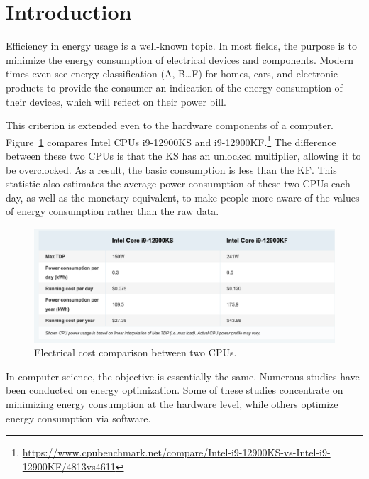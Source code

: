 

\section{Introduction}
Efficiency in energy usage is a well-known topic.
In most fields, the purpose is to minimize the energy consumption of electrical devices and components.
Modern times even see energy classification (A, B\dots F) for homes, cars, and electronic products to provide the consumer an indication of the energy consumption of their devices, which will reflect on their power bill.

This criterion is extended even to the hardware components of a computer.
Figure~\ref{fig:soa_comparaisoncpu} compares Intel CPUs i9-12900KS and i9-12900KF.\footnote{\url{https://www.cpubenchmark.net/compare/Intel-i9-12900KS-vs-Intel-i9-12900KF/4813vs4611}}
The difference between these two CPUs is that the KS has an unlocked multiplier, allowing it to be overclocked.
As a result, the basic consumption is less than the KF.
This statistic also estimates the average power consumption of these two CPUs each day, as well as the monetary equivalent, to make people more aware of the values of energy consumption rather than the raw data.

\begin{figure}
    \includegraphics[width=\linewidth]{imgs/cpu_cost_comparaison}
    \caption{Electrical cost comparison between two CPUs.}
    \label{fig:soa_comparaisoncpu}
\end{figure}

In computer science, the objective is essentially the same.
Numerous studies have been conducted on energy optimization.
Some of these studies concentrate on minimizing energy consumption at the hardware level, while others optimize energy consumption via software.




